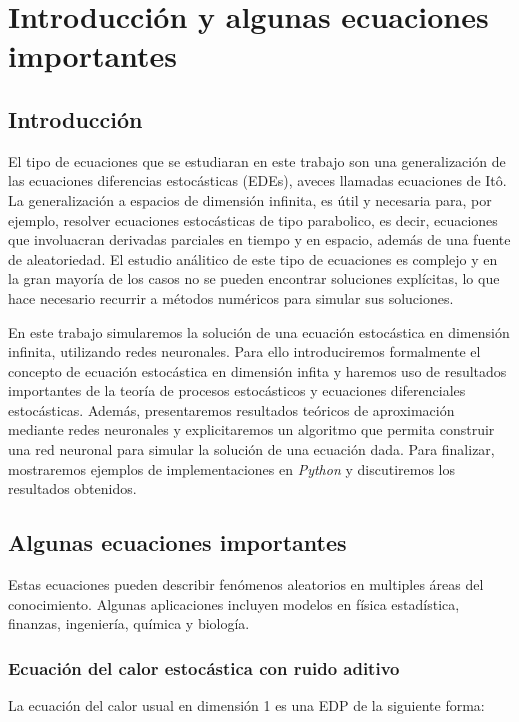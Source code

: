 \section{Introducción y algunas ecuaciones importantes}

\subsection{Introducción}
El tipo de ecuaciones que se estudiaran en este trabajo son una generalización de las ecuaciones diferencias estocásticas (EDEs), aveces llamadas ecuaciones de Itô. La generalización a espacios de dimensión infinita, es útil y necesaria para, por ejemplo, resolver ecuaciones estocásticas de tipo parabolico, es decir, ecuaciones que involuacran derivadas parciales en tiempo y en espacio, además de una fuente de aleatoriedad. El estudio análitico de este tipo de ecuaciones es complejo y en la gran mayoría de los casos no se pueden encontrar soluciones explícitas, lo que hace necesario recurrir a métodos numéricos para simular sus soluciones.

En este trabajo simularemos la solución de una ecuación estocástica en dimensión infinita, utilizando redes neuronales. Para ello introduciremos formalmente el concepto de ecuación estocástica en dimensión infita y haremos uso de resultados importantes de la teoría de procesos estocásticos y ecuaciones diferenciales estocásticas. Además, presentaremos resultados teóricos de aproximación mediante redes neuronales y explicitaremos un algoritmo que permita construir una red neuronal para simular la solución de una ecuación dada. Para finalizar, mostraremos ejemplos de implementaciones en \textit{Python} y discutiremos los resultados obtenidos.

\subsection{Algunas ecuaciones importantes}

Estas ecuaciones pueden describir fenómenos aleatorios en multiples áreas del conocimiento. Algunas aplicaciones incluyen modelos en física estadística, finanzas, ingeniería, química y biología.

\subsubsection{Ecuación del calor estocástica con ruido aditivo}

La ecuación del calor usual en dimensión 1 es una EDP de la siguiente forma:


